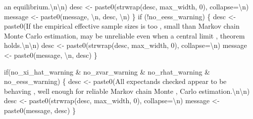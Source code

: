 \documentclass[
  letterpaper,
  DIV=11,
  numbers=noendperiod]{scrartcl}
\newenvironment{Shaded}{\begin{snugshade}}{\end{snugshade}}
\newcommand{\AttributeTok}[1]{\textcolor[rgb]{0.40,0.45,0.13}{#1}}
\newcommand{\ControlFlowTok}[1]{\textcolor[rgb]{0.00,0.23,0.31}{#1}}
\newcommand{\DecValTok}[1]{\textcolor[rgb]{0.68,0.00,0.00}{#1}}
\newcommand{\FunctionTok}[1]{\textcolor[rgb]{0.28,0.35,0.67}{#1}}
\newcommand{\NormalTok}[1]{\textcolor[rgb]{0.00,0.23,0.31}{#1}}
\newcommand{\OtherTok}[1]{\textcolor[rgb]{0.00,0.23,0.31}{#1}}
\newcommand{\SpecialCharTok}[1]{\textcolor[rgb]{0.37,0.37,0.37}{#1}}
\newcommand{\StringTok}[1]{\textcolor[rgb]{0.13,0.47,0.30}{#1}}
\begin{document}
\begin{Shaded}
\begin{Highlighting}[]
                   \StringTok{\textquotesingle{}an equilibrium.}\SpecialCharTok{\textbackslash{}n\textbackslash{}n}\StringTok{\textquotesingle{}}\NormalTok{)}
\NormalTok{    desc }\OtherTok{\textless{}{-}} \FunctionTok{paste0}\NormalTok{(}\FunctionTok{strwrap}\NormalTok{(desc, max\_width, }\DecValTok{0}\NormalTok{), }\AttributeTok{collapse=}\StringTok{\textquotesingle{}}\SpecialCharTok{\textbackslash{}n}\StringTok{\textquotesingle{}}\NormalTok{)}
\NormalTok{    message }\OtherTok{\textless{}{-}} \FunctionTok{paste0}\NormalTok{(message, }\StringTok{\textquotesingle{}}\SpecialCharTok{\textbackslash{}n}\StringTok{\textquotesingle{}}\NormalTok{, desc, }\StringTok{\textquotesingle{}}\SpecialCharTok{\textbackslash{}n}\StringTok{\textquotesingle{}}\NormalTok{)}
\NormalTok{  \}}
  \ControlFlowTok{if}\NormalTok{ (}\SpecialCharTok{!}\NormalTok{no\_eess\_warning) \{}
\NormalTok{    desc }\OtherTok{\textless{}{-}} \FunctionTok{paste0}\NormalTok{(}\StringTok{\textquotesingle{}If the empirical effective sample sizes is too \textquotesingle{}}\NormalTok{,}
                   \StringTok{\textquotesingle{}small than Markov chain Monte Carlo estimation\textquotesingle{}}\NormalTok{,}
                   \StringTok{\textquotesingle{}may be unreliable even when a central limit \textquotesingle{}}\NormalTok{,}
                   \StringTok{\textquotesingle{}theorem holds.}\SpecialCharTok{\textbackslash{}n\textbackslash{}n}\StringTok{\textquotesingle{}}\NormalTok{)}
\NormalTok{    desc }\OtherTok{\textless{}{-}} \FunctionTok{paste0}\NormalTok{(}\FunctionTok{strwrap}\NormalTok{(desc, max\_width, }\DecValTok{0}\NormalTok{), }\AttributeTok{collapse=}\StringTok{\textquotesingle{}}\SpecialCharTok{\textbackslash{}n}\StringTok{\textquotesingle{}}\NormalTok{)}
\NormalTok{    message }\OtherTok{\textless{}{-}} \FunctionTok{paste0}\NormalTok{(message, }\StringTok{\textquotesingle{}}\SpecialCharTok{\textbackslash{}n}\StringTok{\textquotesingle{}}\NormalTok{, desc)}
\NormalTok{  \}}

  \ControlFlowTok{if}\NormalTok{(no\_xi\_hat\_warning }\SpecialCharTok{\&}\NormalTok{ no\_zvar\_warning }\SpecialCharTok{\&} 
\NormalTok{     no\_rhat\_warning }\SpecialCharTok{\&}\NormalTok{ no\_eess\_warning) \{}
\NormalTok{    desc }\OtherTok{\textless{}{-}} \FunctionTok{paste0}\NormalTok{(}\StringTok{\textquotesingle{}All expectands checked appear to be behaving \textquotesingle{}}\NormalTok{,}
                   \StringTok{\textquotesingle{}well enough for reliable Markov chain Monte \textquotesingle{}}\NormalTok{,}
                   \StringTok{\textquotesingle{}Carlo estimation.}\SpecialCharTok{\textbackslash{}n\textbackslash{}n}\StringTok{\textquotesingle{}}\NormalTok{)}
\NormalTok{    desc }\OtherTok{\textless{}{-}} \FunctionTok{paste0}\NormalTok{(}\FunctionTok{strwrap}\NormalTok{(desc, max\_width, }\DecValTok{0}\NormalTok{), }\AttributeTok{collapse=}\StringTok{\textquotesingle{}}\SpecialCharTok{\textbackslash{}n}\StringTok{\textquotesingle{}}\NormalTok{)}
\NormalTok{    message }\OtherTok{\textless{}{-}} \FunctionTok{paste0}\NormalTok{(message, desc)}
\NormalTok{  \}}


\end{Highlighting}
\end{Shaded}
\end{document}
